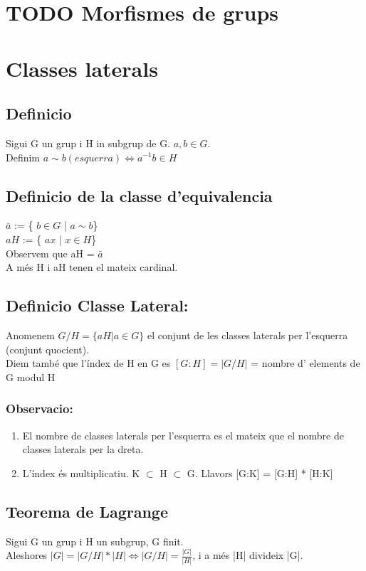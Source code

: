 \documentclass[11pt]{article}
\begin{document}
\section{{\bfseries\sffamily TODO} Morfismes de grups}
\label{sec:org846f1b7}
\section{Classes laterals}
\label{sec:org2fbcab7}
\subsection{Definicio}
\label{sec:orgcc3b064}
Sigui G un grup i H in subgrup de G. \(a,b \in G\). \\
Definim \(a \sim b (esquerra) \iff a^{-1}b \in H\)
\subsection{Definicio de la classe d'equivalencia}
\label{sec:orgc10715b}
\(\bar{a}\) := \{ \(b \in G\) | \(a \sim b\)\} \\
\(aH\) := \{ \(ax\) | \(x \in H\)\} \\
Observem que aH = \(\bar{a}\) \\
A més H i aH tenen el mateix cardinal.

\subsection{Definicio Classe Lateral:}
\label{sec:orgc30bfcb}
Anomenem \(G/H = \{aH | a \in G\}\) el conjunt de les classes laterals per l'esquerra (conjunt quocient). \\
Diem també que l'índex de H en G es \([G:H] = |G/H|\) = nombre d' elements de G modul H

\subsubsection{Observacio:}
\label{sec:org3d2bafe}
\begin{enumerate}
\item El nombre de classes laterals per l'esquerra es el mateix que el nombre de classes laterals per la dreta.
\item L'índex és multiplicatiu. K \(\subset\) H \(\subset\) G. Llavors [G:K] = [G:H] * [H:K]
\end{enumerate}

\subsection{Teorema de Lagrange}
\label{sec:orgd16bbc7}
Sigui G un grup i H un subgrup, G finit. \\
Aleshores \(|G| = |G/H| * |H| \iff |G/H| = \frac{|G|}{|H|}\), i a més |H| divideix |G|.
\end{document}

